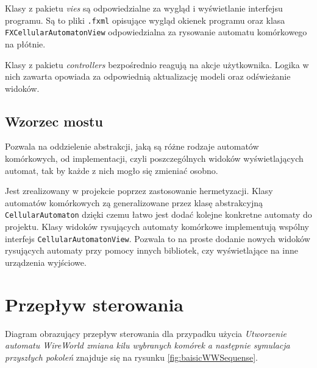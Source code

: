 \documentclass{report}
\begin{document}
Klasy z pakietu \textit{vies} są odpowiedzialne za wygląd i wyświetlanie interfejsu programu. Są to pliki \texttt{.fxml} opisujące wygląd okienek programu oraz klasa \texttt{FXCellularAutomatonView} odpowiedzialna za rysowanie automatu komórkowego na płótnie.

Klasy z pakietu \textit{controllers} bezpośrednio reagują na akcje użytkownika. Logika w nich zawarta opowiada za odpowiednią aktualizację modeli oraz odświeżanie widoków.

\subsection{Wzorzec mostu}
Pozwala na oddzielenie abstrakcji, jaką są różne rodzaje automatów komórkowych, od implementacji, czyli poszczególnych widoków wyświetlających automat, tak by każde z nich mogło się zmieniać osobno.

Jest zrealizowany w projekcie poprzez zastosowanie hermetyzacji.
Klasy automatów komórkowych zą generalizowane przez klasę abstrakcyjną \texttt{CellularAutomaton} dzięki czemu łatwo jest dodać kolejne konkretne automaty do projektu.
Klasy widoków rysujących automaty komórkowe implementują wspólny interfejs \texttt{CellularAutomatonView}. Pozwala to na proste dodanie nowych widoków rysujących automaty przy pomocy innych bibliotek, czy wyświetlające na inne urządzenia wyjściowe.


\section{Przepływ sterowania}
Diagram obrazujący przepływ sterowania dla przypadku użycia \textit{Utworzenie automatu WireWorld zmiana kilu wybranych komórek a następnie symulacja przyszłych pokoleń} znajduje się na rysunku \ref{fig:baisicWWSequense}.
\end{document}
